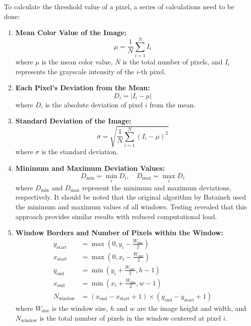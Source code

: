 \documentclass[sigconf]{acmart}
\begin{document}
To calculate the threshold value of a pixel, a series of calculations need to be done:

\begin{enumerate}
    \item \textbf{Mean Color Value of the Image:}  
    \begin{equation}
        \mu = \frac{1}{N} \sum_{i=1}^{N} I_i
    \end{equation}
    where \( \mu \) is the mean color value, \( N \) is the total number of pixels, and \( I_i \) represents the grayscale intensity of the \( i \)-th pixel.

    \item \textbf{Each Pixel's Deviation from the Mean:}  
    \begin{equation}
        D_i = | I_i - \mu |
    \end{equation}
    where \( D_i \) is the absolute deviation of pixel \( i \) from the mean.

    \item \textbf{Standard Deviation of the Image:}  
    \begin{equation}
        \sigma = \sqrt{\frac{1}{N} \sum_{i=1}^{N} (I_i - \mu)^2}
    \end{equation}
    where \( \sigma \) is the standard deviation.

    \item \textbf{Minimum and Maximum Deviation Values:}  
    \begin{equation}
        D_{\min} = \min_{i} D_i, \quad D_{\max} = \max_{i} D_i
    \end{equation}
    where \( D_{\min} \) and \( D_{\max} \) represent the minimum and maximum deviations, respectively. It should be noted that the original algorithm by Bataineh \cite{Bataineh2011} used the minimum and maximum values of all windows. Testing revealed that this approach provides similar results with reduced computational load.

    \item \textbf{Window Borders and Number of Pixels within the Window:}  
    \begin{align}
        y_{\text{start}} &= \max(0, y_i - \frac{W_\text{size}}{2}) \\
        x_{\text{start}} &= \max(0, x_i - \frac{W_\text{size}}{2}) \\
        y_{\text{end}} &= \min(y_i + \frac{W_\text{size}}{2}, h - 1) \\
        x_{\text{end}} &= \min(x_i + \frac{W_\text{size}}{2}, w - 1) \\
        N_{\text{window}} &= (x_{\text{end}} - x_{\text{start}} + 1) \times (y_{\text{end}} - y_{\text{start}} + 1)
    \end{align}
    where \( W_\text{size} \) is the window size, \( h \) and \( w \) are the image height and width, and \( N_{\text{window}} \) is the total number of pixels in the window centered at pixel \( i \).


\end{enumerate}
\end{document}
